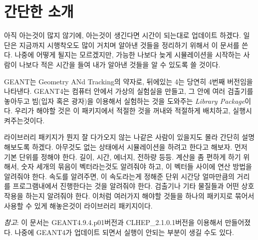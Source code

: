 \chapter{간단한 소개}
아직 아는것이 많지 않기에, 아는것이 생긴다면 시간이 되는대로 업데이트
하겠다. 일단은 지금까지 시행착오도 많이 거치며 알아낸 것들을 정리하기 위해서 이
문서를 쓴다. 나중에 어떻게 될지는 모르겠지만, 가능한 나보다 늦게 시뮬레이션을
시작하는 사람이 나보다 적은 시간을 들여 내가 알아낸 것들을 알 수 있도록 쓸
것이다.

\vspace{5mm}
GEANT는 Geometry ANd Tracking의 약자로, 뒤에있는 4는 당연히 4번째
버전임을 나타낸다. GEANT4는 컴퓨터 안에서 가상의 실험실을 만들고, 그 안에 여러
검출기를 놓아두고 빔(입자 혹은 광자)을 이용해서 실험하는 것을 도와주는
\emph{Library Package}이다. 우리가 해야할 것은 이 패키지에서 적절한 것을 꺼내와
적절하게 배치하고, 실행시켜주는것이다.

라이브러리 패키지가 뭔지 잘 다가오지 않는 나같은 사람이 있을지도 몰라 간단히
설명해보도록 하겠다. 아무것도 없는 상태에서 시뮬레이션을 하려고 한다고 해보자.
먼저 기본 단위를 정해야 한다. 길이, 시간, 에너지, 전하량 등등. 계산을 좀 편하게
하기 위해서, 숫자 세개의 묶음이 벡터라는것도 알려줘야 하고, 이 벡터들 사이에
연산 방법을 알려줘야 한다. 속도를 알려주면, 이 속도라는게 정해준 단위 시간당
얼마만큼의 거리를 프로그램내에서 진행한다는 것을 알려줘야 한다. 검출기나 기타
물질들과 어떤 상호작용을 하는지 알려줘야 한다. 이처럼 여러가지 해야할 것들을
하나의 패키지로 묶어서 사용할 수 있게 해놓은것이 라이브러리 패키지이다.

\vspace{5mm}
\emph{참고}: 이 문서는 GEANT4.9.4.p01버전과 CLHEP\_2.1.0.1버전을 이용해서
만들어졌다. 나중에 GEANT4가 업데이트 되면서 실행이 안되는 부분이 생길 수도
있다.
